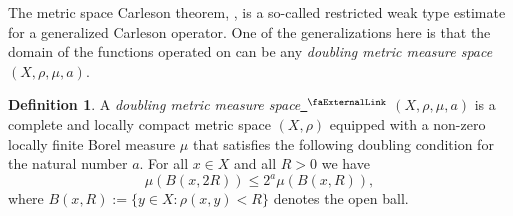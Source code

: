 \documentclass[12pt, reqno]{amsart}
\newcommand{\extlink}{~\ensuremath{{}^\text{\faExternalLink}}}
\theoremstyle{definition}
\newtheorem{definition}{Definition}[section]
\theoremstyle{plain}
\begin{document}
The metric space Carleson theorem, , is a so-called restricted weak type estimate for a generalized Carleson operator. One of the generalizations here is that the domain of the functions operated on can be any \emph{doubling metric measure space} $(X,\rho,\mu, a)$.

\begin{definition}\label{def:doubling}
A \emph{doubling metric measure
space}\href{https://github.com/fpvandoorn/carleson/blob/AFM-frozen/Carleson/Defs.lean#L98-L102}{\extlink}
$(X,\rho,\mu, a)$ is a complete and locally compact metric space $(X,\rho)$
equipped with a non-zero locally finite Borel measure $\mu$ that satisfies
the following doubling condition for the natural number $a$. For all $x\in X$ and
all $R>0$ we have
\begin{equation*}
	\mu(B(x,2R))\le 2^a\mu(B(x,R)),
\end{equation*}
where $B(x,R):=\{y\in X: \rho(x,y)<R\}$ denotes the open ball.
\end{definition}
\end{document}
